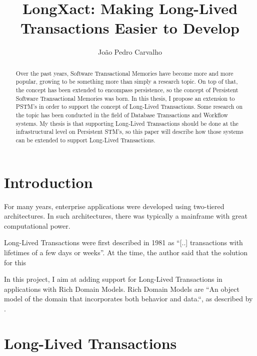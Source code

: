 \documentclass{llncs}
\begin{document}
\title{LongXact: Making Long-Lived Transactions Easier to Develop}

\author{Jo\~{a}o Pedro Carvalho}
\maketitle


\begin{abstract}
Over the past years, Software Transactional Memories have become more
and more popular, growing to be something more than simply a research topic. On top of
that, the concept has been extended to encompass persistence, so
the concept of Persistent Software Transactional Memories was born. In
this thesis, I propose an extension to PSTM's in order to support the
concept of Long-Lived Transactions. Some research on the topic has
been conducted in the field of Database Transactions and Workflow
systems. My thesis is that supporting Long-Lived Transactions should
be done at the infrastructural level on Persistent STM's, so this
paper will describe how those systems can be extended to support
Long-Lived Transactions.
\end{abstract}


\section{Introduction}

For many years, enterprise applications were developed using
two-tiered architectures. In such architectures, there was typically a
mainframe with great computational power.

Long-Lived Transactions were first described in
1981 as ``[..] transactions with lifetimes of a few days or
weeks''\cite{gray1981transaction}. At the time, the author said that the
solution for this 

In this project, I aim at adding support for Long-Lived Transactions
in applications with Rich Domain Models.
Rich Domain Models are ``An object model of the domain that
incorporates both behavior and data.``, as described by \cite{fowler2003patterns}.

\section{Long-Lived Transactions}
\end{document}
